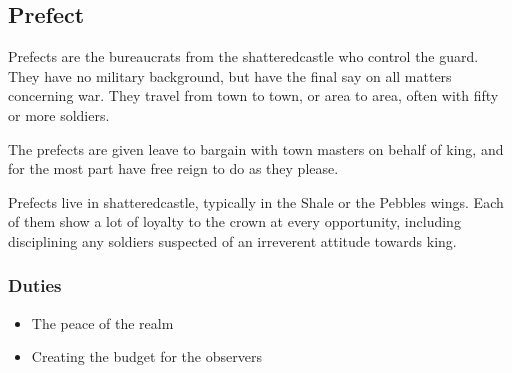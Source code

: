 \begin{multicols}{2}
\begin{itemize}
\end{itemize}

\subsection{Prefect}

Prefects are the bureaucrats from the \gls{shatteredcastle} who control the \gls{guard}.
They have no military background, but have the final say on all matters concerning war.
They travel from town to town, or area to area, often with fifty or more soldiers.

The prefects are given leave to bargain with town masters on behalf of \gls{king}, and for the most part have free reign to do as they please.

Prefects live in \gls{shatteredcastle}, typically in the Shale or the Pebbles wings.
Each of them show a lot of loyalty to the crown at every opportunity, including disciplining any soldiers suspected of an irreverent attitude towards \gls{king}.

\subsubsection{Duties}

\begin{itemize}

  \item{The peace of the realm}
  \item{Creating the budget for the observers}

\end{itemize}

\end{multicols}
